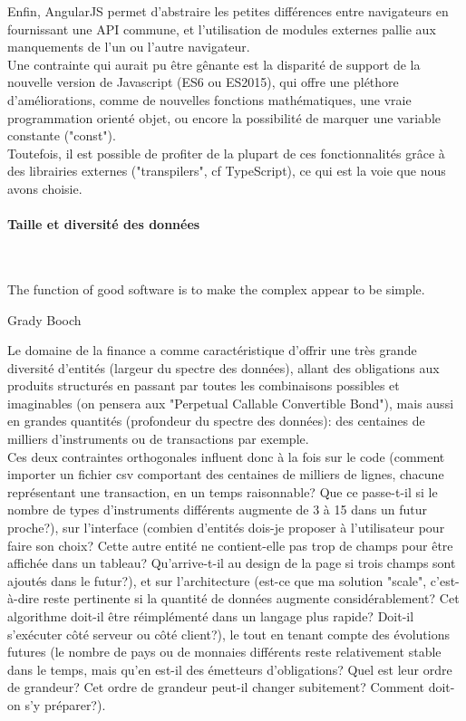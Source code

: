 \documentclass[a4paper,french,12pt]{article}
\begin{document}
 Enfin, AngularJS permet d'abstraire les petites différences entre navigateurs en fournissant une API commune, et l'utilisation de modules externes pallie aux manquements de l'un ou l'autre navigateur.~\\	
 
 Une contrainte qui aurait pu être gênante est la disparité de support de la nouvelle version de Javascript (ES6 ou ES2015), qui offre une pléthore d'améliorations, comme de nouvelles fonctions mathématiques, une vraie programmation orienté objet, ou encore la possibilité de marquer une variable constante ("const").~\\	
 
 Toutefois, il est possible de profiter de la plupart de ces fonctionnalités grâce à des librairies externes ("transpilers", cf TypeScript), ce qui est la voie que nous avons choisie. 

	
		\paragraph{Taille et diversité des données} ~\\
		\epigraph{The function of good software is to make the complex appear to be simple.}{Grady Booch}

		Le domaine de la finance a comme caractéristique d'offrir une très grande diversité d'entités (largeur du spectre des données), allant des obligations aux produits structurés en passant par toutes les combinaisons possibles et imaginables (on pensera aux "Perpetual Callable Convertible Bond"), mais aussi en grandes quantités (profondeur du spectre des données): des centaines de milliers d'instruments ou de transactions par exemple.~\\
		
		Ces deux contraintes orthogonales influent donc à la fois sur le code (comment importer un fichier csv comportant des centaines de milliers de lignes, chacune représentant une transaction, en un temps raisonnable? Que ce passe-t-il si le nombre de types d'instruments différents augmente de 3 à 15 dans un futur proche?), sur l'interface (combien d'entités dois-je proposer à l'utilisateur pour faire son choix? Cette autre entité ne contient-elle pas trop de champs pour être affichée dans un tableau? Qu'arrive-t-il au design de la page si trois champs sont ajoutés dans le futur?), et sur l'architecture (est-ce que ma solution "scale", c'est-à-dire reste pertinente si la quantité de données augmente considérablement? Cet algorithme doit-il être réimplémenté dans un langage plus rapide? Doit-il s'exécuter côté serveur ou côté client?), le tout en tenant compte des évolutions futures (le nombre de pays ou de monnaies différents reste relativement stable dans le temps, mais qu'en est-il des émetteurs d'obligations? Quel est leur ordre de grandeur? Cet ordre de grandeur peut-il changer subitement? Comment doit-on s'y préparer?).~\\
		
\end{document}
